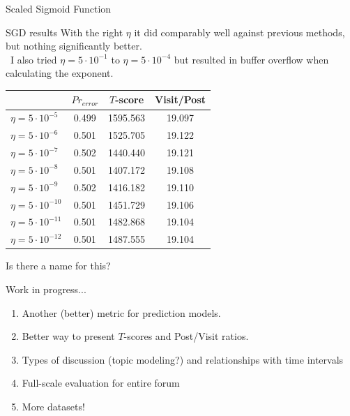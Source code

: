 \documentclass[12pt]{presentation}
\newcommand{\weights}{\mathbf{w}}
\newcommand{\X}{\mathbf{X}}
\begin{document}
\begin{frame}{Scaled Sigmoid Function}
\begin{center}
\end{center}
\end{frame}

\begin{frame}{SGD results}
	With the right $\eta$ it did comparably well against previous methods, but nothing significantly better.\\\
	I also tried $\eta=5\cdot10^{-1}$ to $\eta=5\cdot10^{-4}$ but resulted in buffer overflow
	when calculating the exponent.
	\begin{center}
		\footnotesize
		\begin{tabular}{ | l | c | c | c | }
			\hline
		& $Pr_{error}$		  & $T$-score			   &	Visit/Post\\
			\hline
	$\eta=5\cdot10^{-5}$ &	    0.499 &	  1595.563 &	    19.097 \\
	$\eta=5\cdot10^{-6}$ &	    0.501 &	  1525.705 &	    19.122 \\
	$\eta=5\cdot10^{-7}$ &	    0.502 &	  1440.440 &	    19.121 \\
			\rowcolor{green}
	$\eta=5\cdot10^{-8}$ &	    0.501 &	  1407.172 &	    19.108 \\
	$\eta=5\cdot10^{-9}$ &	    0.502 &	  1416.182 &	    19.110 \\
	$\eta=5\cdot10^{-10}$ &	    0.501 &	  1451.729 &	    19.106 \\
	$\eta=5\cdot10^{-11}$ &	    0.501 &	  1482.868 &	    19.104 \\
	$\eta=5\cdot10^{-12}$ &	    0.501 &	  1487.555 &	    19.104 \\
			\hline
		\end{tabular}
	\end{center}

	Is there a name for this?
\end{frame}

\begin{frame}{Work in progress...}
	\large
	\begin{enumerate}
		\item Another (better) metric for prediction models.
		\item Better way to present $T$-scores and Post/Visit ratios.
		\item Types of discussion (topic modeling?) and relationships with time intervals
		\item Full-scale evaluation for entire forum
		\item More datasets!
	\end{enumerate}
\end{frame}
\end{document}

